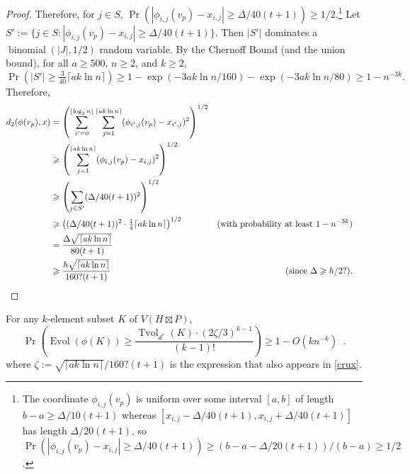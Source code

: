 \documentclass{patmorin}
\renewcommand{\ge}{\geqslant}
\DeclareMathOperator{\evol}{Evol}
\DeclareMathOperator{\tvol}{Tvol}
\begin{document}
\begin{proof}
  Therefore, for $j\in S$, $\Pr(|\phi_{i,j}(v_p)-x_{i,j}|\ge \Delta/40(t+1))\ge 1/2$.\footnote{The coordinate $\phi_{i,j}(v_p)$ is uniform over some interval $[a,b]$ of length $b-a\ge \Delta/10(t+1)$ whereas $[x_{i,j}-\Delta/40(t+1),x_{i,j}+\Delta/40(t+1)]$ has length $\Delta/20(t+1)$, so $\Pr(|\phi_{i,j}(v_p)-x_{i,j}|\ge \Delta/40(t+1))\ge (b-a-\Delta/20(t+1))/(b-a)\ge 1/2$.}
  Let $S':=\{j\in S:  |\phi_{i,j}(v_p)-x_{i,j}|\ge \Delta/40(t+1)\}$.  Then $|S'|$ dominates a $\operatorname{binomial}(|J|,1/2)$ random variable.  By the Chernoff Bound (and the union bound), for all $a\ge 500$, $n\ge 2$, and $k\ge 2$,
  $$\Pr(|S'|\ge \tfrac{3}{40}\lceil a k\ln n\rceil)\ge 1-\exp(-3ak\ln n/160)-\exp(-3ak\ln n/80)\ge 1-n^{-3k}.$$
  Therefore,
  \begin{align*}
    d_2(\phi(v_p),x)
    & = \left(\sum_{i'=0}^{\lfloor\log_2 n\rfloor}\sum_{j=1}^{\lceil ak\ln  n\rceil}(\phi_{i',j}(v_p)-x_{i',j})^2\right)^{1/2} \\
    & \ge \left(\sum_{j=1}^{\lceil ak\ln  n\rceil}(\phi_{i,j}(v_p)-x_{i,j})^2\right)^{1/2} \\
    & \ge \left(\sum_{j\in S'}(\Delta/40(t+1))^2\right)^{1/2} \\
    & \ge \left((\Delta/40(t+1))^2\cdot \tfrac{1}{4}\lceil ak\ln  n\rceil\right)^{1/2}
      & \text{(with probability at least $1-n^{-3k}$)} \\
    & = \frac{\Delta\sqrt{\lceil ak\ln  n\rceil}}{80(t+1)} \\
    & \ge \frac{h\sqrt{\lceil ak\ln n\rceil}}{160?(t+1)}
     & \text{(since $\Delta\ge h/2?$)}. &
    \qedhere
  \end{align*}
\end{proof}

\begin{lem}\label{volume_preserver}
  For any $k$-element subset $K$ of $V(H\boxtimes P)$,
  \[
    \Pr\left(\evol(\phi(K)) \ge \frac{\tvol_{d^*}(K)\cdot(2\zeta/3)^{k-1}}{(k-1)!}\right) \ge 1- O(kn^{-k}) \enspace .
  \]
  where $\zeta:=\sqrt{\lceil ak\ln n\rceil}/160?(t+1)$ is the expression that also appears in \cref{crux}.
\end{lem}
\end{document}
